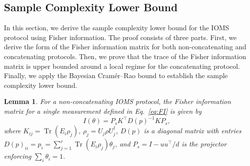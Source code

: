 \documentclass[12pt]{article}
\newtheorem{lemma}{Lemma}
\begin{document}
\subsection{Sample Complexity Lower Bound}

In this section, we derive the sample complexity lower bound for the IOMS protocol using Fisher information. The proof consists of three parts. First, we derive the form of the Fisher information matrix for both non-concatenating and concatenating protocols. Then, we prove that the trace of the Fisher information matrix is upper bounded around a local regime for the concatenating protocol. Finally, we apply the Bayesian Cramér--Rao bound to establish the sample complexity lower bound.

\begin{lemma}\label{lm:FImatrix}
For a non-concatenating IOMS protocol, the Fisher information matrix for a single measurement defined in Eq.~\ref{eq:FI} is given by
\begin{equation}\label{eq:FIM}
    I(\theta) = P_s K^\top D(p)^{-1} K P_s,
\end{equation}
where $K_{ij} = \operatorname{Tr}(E_i\rho_j)$, $\rho_j = U_j \rho U_j^\dagger$, $D(p)$ is a diagonal matrix with entries $D(p)_{ii} = p_i = \sum_{j=1}^r \operatorname{Tr}(E_i\rho_j)\theta_j$, and $P_s = I - u u^\top/d$ is the projector enforcing $\sum_i \theta_i = 1$.
\end{lemma}
\end{document}
